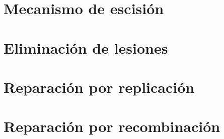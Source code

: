 


\section{Mecanismo de escisión}



\section{Eliminación de lesiones}



\section{Reparación por replicación}



\section{Reparación por recombinación}


